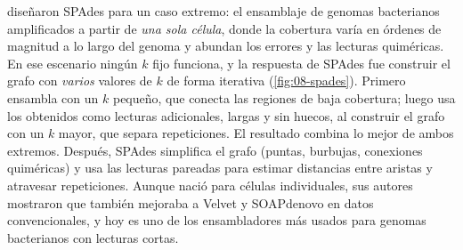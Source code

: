 \textcite{c08-bankevich2012} diseñaron SPAdes para un caso extremo: el ensamblaje de genomas bacterianos amplificados a partir de \emph{una sola célula}, donde la cobertura varía en órdenes de magnitud a lo largo del genoma y abundan los errores y las lecturas quiméricas. En ese escenario ningún $k$ fijo funciona, y la respuesta de SPAdes fue construir el grafo con \emph{varios} valores de $k$ de forma iterativa (\cref{fig:08-spades}). Primero ensambla con un $k$ pequeño, que conecta las regiones de baja cobertura; luego usa los  obtenidos como lecturas adicionales, largas y sin huecos, al construir el grafo con un $k$ mayor, que separa repeticiones. El resultado combina lo mejor de ambos extremos. Después, SPAdes simplifica el grafo (puntas, burbujas, conexiones quiméricas) y usa las lecturas pareadas para estimar distancias entre aristas y atravesar repeticiones. Aunque nació para células individuales, sus autores mostraron que también mejoraba a Velvet y SOAPdenovo en datos convencionales, y hoy es uno de los ensambladores más usados para genomas bacterianos con lecturas cortas.

